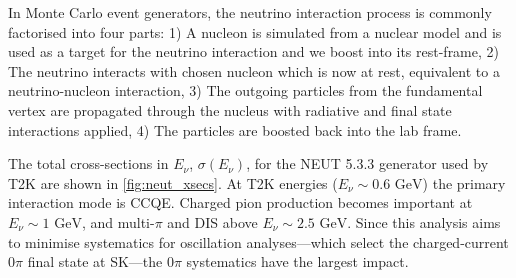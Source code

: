 In Monte Carlo event generators, the neutrino interaction process is commonly factorised into four parts: 1) A nucleon is simulated from a nuclear model and is used as a target for the neutrino interaction and we boost into its rest-frame, 2) The neutrino interacts with chosen nucleon which is now at rest, equivalent to a neutrino-nucleon interaction, 3) The outgoing particles from the fundamental vertex are propagated through the nucleus with radiative and final state interactions applied, 4) The particles are boosted back into the lab frame.

The total cross-sections in $E_\nu$, $\sigma(E_\nu)$, for the NEUT 5.3.3\cite{neut} generator used by T2K are shown in \autoref{fig:neut_xsecs}. At T2K energies ($E_\nu\sim0.6\text{ GeV}$) the primary interaction mode is CCQE. Charged pion production becomes important at $E_\nu\sim1\text{ GeV}$, and multi-$\pi$ and DIS above $E_\nu\sim2.5\text{ GeV}$. Since this analysis aims to minimise systematics for oscillation analyses---which select the charged-current 0$\pi$ final state at SK---the 0$\pi$ systematics have the largest impact.
